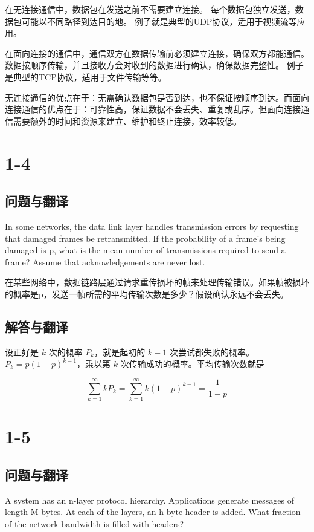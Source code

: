 在无连接通信中，数据包在发送之前不需要建立连接。
每个数据包独立发送，数据包可能以不同路径到达目的地。
例子就是典型的UDP协议，适用于视频流等应用。

在面向连接的通信中，通信双方在数据传输前必须建立连接，确保双方都能通信。
数据按顺序传输，并且接收方会对收到的数据进行确认，确保数据完整性。
例子是典型的TCP协议，适用于文件传输等等。

无连接通信的优点在于：无需确认数据包是否到达，也不保证按顺序到达。而面向连接通信的优点在于：可靠性高，保证数据不会丢失、重复或乱序。但面向连接通信需要额外的时间和资源来建立、维护和终止连接，效率较低。

\section{1-4}

\subsection{问题与翻译}

In some networks, the data link layer handles transmission errors by requesting that damaged frames be retransmitted. If the probability of a frame's being damaged is p, what is the mean number of transmissions required to send a frame? Assume that acknowledgements are never lost.

在某些网络中，数据链路层通过请求重传损坏的帧来处理传输错误。如果帧被损坏的概率是p，发送一帧所需的平均传输次数是多少？假设确认永远不会丢失。

\subsection{解答与翻译}

设正好是 \( k \) 次的概率 \( P_k \)，就是起初的 \( k-1 \) 次尝试都失败的概率。\( P_k = p(1 - p)^{k-1} \)，乘以第 \( k \) 次传输成功的概率。平均传输次数就是

\[
\sum_{k=1}^{\infty} k P_k = \sum_{k=1}^{\infty} k (1-p)^{k-1} = \frac{1}{1-p}
\]

\section{1-5}

\subsection{问题与翻译}

A system has an n-layer protocol hierarchy. Applications generate messages of length M bytes. At each of the layers, an h-byte header is added. What fraction of the network bandwidth is filled with headers?


